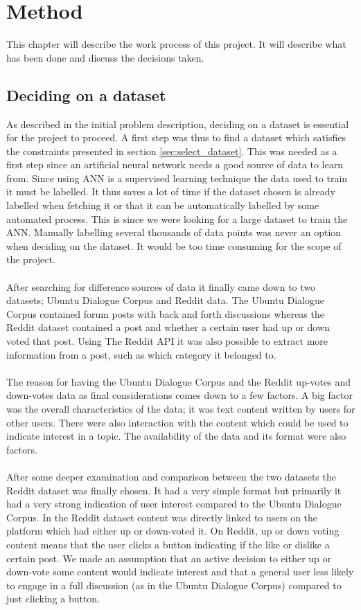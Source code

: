 \chapter{Method}
This chapter will describe the work process of this project. It will describe what has been done and discuss the decisions taken.

\section{Deciding on a dataset}\label{sec:deciding_dataset}
As described in the initial problem description, deciding on a dataset is essential for the project to proceed. A first step was thus to find a dataset which satisfies the constraints presented in section \ref{sec:select_dataset}. This was needed as a first step since an artificial neural network needs a good source of data to learn from. Since using ANN is a supervised learning technique the data used to train it must be labelled. It thus saves a lot of time if the dataset chosen is already labelled when fetching it or that it can be automatically labelled by some automated process. This is since we were looking for a large dataset to train the ANN. Manually labelling several thousands of data points was never an option when deciding on the dataset. It would be too time consuming for the scope of the project.
\\\\
After searching for difference sources of data it finally came down to two datasets; Ubuntu Dialogue Corpus and Reddit data. The Ubuntu Dialogue Corpus contained forum posts with back and forth discussions whereas the Reddit dataset contained a post and whether a certain user had up or down voted that post. Using The Reddit API it was also possible to extract more information from a post, such as which category it belonged to.
\\\\
The reason for having the Ubuntu Dialogue Corpus and the Reddit up-votes and down-votes data as final considerations comes down to a few factors. A big factor was the overall characteristics of the data; it was text content written by users for other users. There were also interaction with the content which could be used to indicate interest in a topic. The availability of the data and its format were also factors.
\\\\
After some deeper examination and comparison between the two datasets the Reddit dataset was finally chosen. It had a very simple format but primarily it had a very strong indication of user interest compared to the Ubuntu Dialogue Corpus. In the Reddit dataset content was directly linked to users on the platform which had either up or down-voted it. On Reddit, up or down voting content means that the user clicks a button indicating if the like or dislike a certain post. We made an assumption that an active decision to either up or down-vote some content would indicate interest and that a general user less likely to engage in a full discussion (as in the Ubuntu Dialogue Corpus) compared to just clicking a button.
